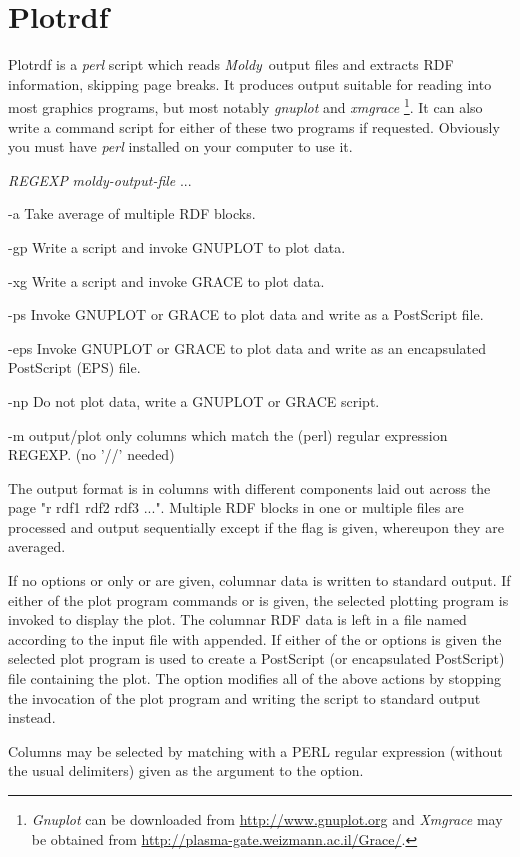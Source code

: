 \documentclass[a4paper,twoside]{report}
\newcommand{\moldy}{\emph{Moldy}}
\begin{document}
\section{Plotrdf}%
Plotrdf is a \emph{perl} script which reads \moldy\ output files and
extracts RDF information, skipping page breaks.  It produces output
suitable for reading into most graphics programs, but most notably
\emph{gnuplot} and \emph{xmgrace}%
\footnote{\emph{Gnuplot} can be downloaded from
  \url{http://www.gnuplot.org} and
\emph{Xmgrace} may be obtained from
\url{http://plasma-gate.weizmann.ac.il/Grace/}.}.
It can also write a command script
for either of these two programs if requested.  Obviously you must
have \emph{perl} installed on your computer to use it.

\begin{center}
 \Lit{[-a]} 
 \Lit{[-gp|-xg]}
 \Lit{[-ps|-eps]}
 \Lit{[-np]}
 \Lit{[-m} \textit{REGEXP}\Lit{]} 
 \textit{moldy-output-file} ...
\end{center}

\begin{Argdescription}  
      \item[-a]         Take average of multiple RDF blocks.
      \item[-gp]        Write a script and invoke GNUPLOT to plot data.
      \item[-xg]        Write a script and invoke GRACE to plot data.
      \item[-ps]        Invoke GNUPLOT or GRACE to plot data and write as a PostScript file.
      \item[-eps]       Invoke GNUPLOT or GRACE to plot data and write as an encapsulated PostScript (EPS) file.
      \item[-np]        Do not plot data, write a GNUPLOT or GRACE script.                                      \item[-m]  output/plot only columns which match the (perl) regular expression REGEXP. (no '//' needed)    
\end{Argdescription}

The output format is in columns with different components laid out
across the page "r rdf1 rdf2 rdf3 ...".  Multiple RDF blocks in one or
multiple files are processed and output sequentially except if the 
flag is given, whereupon they are averaged.

If no options or only  or  are given, columnar data is
written to standard output.  If either of the plot program commands
 or  is given, the selected plotting program is
invoked to display the plot. The columnar RDF data  is left in a file
named according to the input file with  appended.
If either of the  or  options is given the selected
plot program is used to create a PostScript (or encapsulated
PostScript) file containing the plot.  The  option modifies
all of the above actions by stopping the invocation of the plot
program and writing the script to standard output instead.

Columns may be selected by matching with a PERL regular expression
(without the usual delimiters) given as the argument to the 
option.



\end{document}
